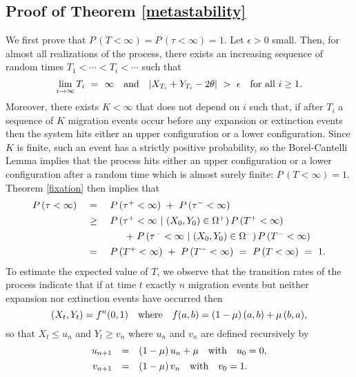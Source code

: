 \subsection*{Proof of Theorem \ref{metastability}}

\indent We first prove that $P \,(T < \infty) = P \,(\tau < \infty) = 1$.
 Let $\epsilon > 0$ small.
 Then, for almost all realizations of the process, there exists an increasing sequence of random times
 $T_1 < \cdots < T_i < \cdots$ such that
 $$ \lim_{i {{\rightarrow}} \infty} T_i \ = \ \infty \quad \hbox{and} \quad |X_{T_i} + Y_{T_i} - 2 \theta| \ > \ \epsilon \quad \hbox{for all} \ i \geq 1. $$
 Moreover, there exists $K < \infty$ that does not depend on $i$ such that, if after $T_i$ a sequence of $K$ migration events
 occur before any expansion or extinction events then the system hits either an upper configuration or a lower configuration.
 Since $K$ is finite, such an event has a strictly positive probability, so the Borel-Cantelli Lemma implies that the process hits either
 an upper configuration or a lower configuration after a random time which is almost surely finite: $P \,(T < \infty) = 1$.
 Theorem \ref{fixation} then implies that
 $$ \begin{array}{rcl}
  P \,(\tau < \infty) \ & = & \
  P \,(\tau^+ < \infty) \ + \ P \,(\tau^- < \infty) \vspace{4pt} \\ & \geq & \
  P \,(\tau^+ < \infty \ | \ (X_0, Y_0) \in \Omega^+) \,P \,(T^+ < \infty) \vspace{4pt} \\ && \hspace{20pt} + \
  P \,(\tau^- < \infty \ | \ (X_0, Y_0) \in \Omega^-) \,P \,(T^- < \infty) \vspace{4pt} \\ & = & \
  P \,(T^+ < \infty) \ + \ P \,(T^- < \infty) \ = \ P \,(T < \infty) \ = \ 1. \end{array} $$
 To estimate the expected value of $T$, we observe that the transition rates of the process indicate that if at time $t$ exactly $n$
 migration events but neither expansion nor extinction events have occurred then
 $$ (X_t, Y_t) = f^n (0, 1) \quad \hbox{where} \quad f (a, b) = (1 - \mu) \,(a, b) + \mu \,(b, a), $$
 so that $X_t \leq u_n$ and $Y_t \geq v_n$ where $u_n$ and $v_n$ are defined recursively by
 $$ \begin{array}{rcl}
     u_{n + 1} & = & (1 - \mu) \,u_n + \mu \quad \hbox{with} \quad u_0 = 0, \vspace{4pt} \\
     v_{n + 1} & = & (1 - \mu) \,v_n \quad \hbox{with} \quad v_0 = 1. \end{array} $$
